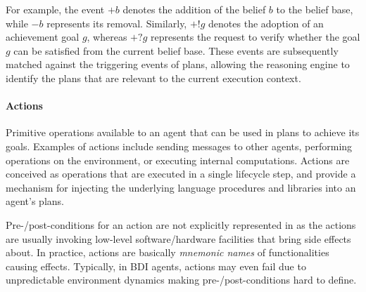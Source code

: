For example, the event $+b$ denotes the addition of the belief $b$ to the belief base, 
while $-b$ represents its removal. 
%
Similarly, $+!g$ denotes the adoption of an achievement goal $g$, 
whereas $+?g$ represents the request to verify whether the goal $g$ can be satisfied from the current belief base. 
%
These events are subsequently matched against the triggering events of plans, 
allowing the reasoning engine to identify the plans that are relevant to the current execution context.

\paragraph{Actions}
Primitive operations available to an agent
that can be used in plans to achieve its goals.
%
Examples of actions include sending messages to other agents,
performing operations on the environment,
or executing internal computations.
%
Actions are conceived as operations that are executed in a single lifecycle step,
and provide a mechanism for injecting the underlying language procedures and libraries into an agent's plans.

Pre-/post-conditions for an action are not explicitly represented in \agentspeak{}
as the actions are usually invoking low-level software/hardware facilities that bring side effects about.
%
In practice, 
\agentspeak{} actions are basically \emph{mnemonic names} of functionalities causing effects.
%
Typically,
in \ac{BDI} agents,
actions may even fail due to unpredictable environment dynamics making pre-/post-conditions hard to define.

